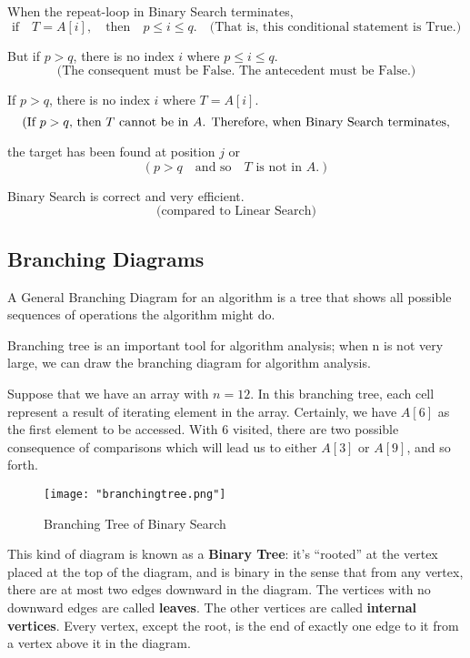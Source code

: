     \begin{remark}
    When the repeat-loop in Binary Search terminates,
    \[ \text{if} \quad T = A[i], \quad \text{then} \quad p \leq i \leq q. \quad \text{(That is, this conditional statement is True.)} \]
    
    But if \( p > q \), there is no index \( i \) where \( p \leq i \leq q \).
    \[ \text{(The consequent must be False. The antecedent must be False.)} \]
    
    If \( p > q \), there is no index \( i \) where \( T = A[i] \).
    \[ \text{(If \( p > q \), then \( T \) cannot be in \( A \). Therefore, when Binary Search terminates,} \]
    
    the target has been found at position \( j \)
    or
    \[ (p > q \quad \text{and so} \quad T \text{ is not in } A.) \]
    
    Binary Search is correct and very efficient.
    \[ \text{(compared to Linear Search)} \]
    \end{remark}

    \subsection*{Branching Diagrams}
    \begin{definition}
        A General Branching Diagram for an algorithm is a tree that shows all possible
        sequences of operations the algorithm might do.
    \end{definition}
    Branching tree is an important tool for algorithm analysis; when n is not very large, we can draw the
    branching diagram for algorithm analysis.

    Suppose that we have an array with $n=12$. In this branching tree, each cell represent a result of iterating element in the array. Certainly, we have $A[6]$ as the first element to be accessed.
    With 6 visited, there are two possible consequence of comparisons which will lead us to either
    $A[3]$ or $A[9]$, and so forth.
    \begin{figure}[H]
        \centering
        \texttt{[image: "branchingtree.png"]}
        \caption{Branching Tree of Binary Search}
    \end{figure}

    This kind of diagram is known as a \textbf{Binary Tree}: it's “rooted” at the vertex
    placed at the top of the diagram, and is binary in the sense that from any vertex,
    there are at most two edges downward in the diagram. The vertices with no
    downward edges are called \textbf{leaves}. The other vertices are called \textbf{internal vertices}.
    Every vertex, except the root, is the end of exactly one edge to it from a vertex
    above it in the diagram.


